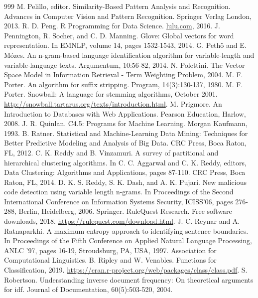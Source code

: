 \documentclass[11pt,openany,executivepaper]{book}
\begin{document}
\begin{thebibliography}{999}
 M. Pelillo, editor. Similarity-Based Pattern Analysis and Recognition. Advances in Computer Vision and Pattern Recognition. Springer Verlag London, 2013.
 R. D. Peng. R Programming for Data Science. \href{http://lulu.com}{lulu.com}, 2016.
 J. Pennington, R. Socher, and C. D. Manning. Glove: Global vectors for word representation. In EMNLP, volume 14, pages 1532-1543, 2014.
 G. Pethö and E. Mózes. An n-gram-based language identification algorithm for variable-length and variable-language texts. Argumentum, 10:56-82, 2014.
 N. Polettini. The Vector Space Model in Information Retrieval - Term Weighting Problem, 2004.
 M. F. Porter. An algorithm for suffix stripping. Program, 14(3):130-137, 1980.
 M. F. Porter. Snowball: A language for stemming algorithms, October 2001. \href{http://snowball.tartarus.org/texts/introduction.html}{http://snowball.tartarus.org/texts/introduction.html}.
 M. Prigmore. An Introduction to Databases with Web Applications. Pearson Education, Harlow, 2008.
 J. R. Quinlan. C4.5: Programs for Machine Learning. Morgan Kaufmann, 1993.
 B. Ratner. Statistical and Machine-Learning Data Mining: Techniques for Better Predictive Modeling and Analysis of Big Data. CRC Press, Boca Raton, FL, 2012.
 C. K. Reddy and B. Vinzamuri. A survey of partitional and hierarchical clustering algorithms. In C. C. Aggarwal and C. K. Reddy, editors, Data Clustering: Algorithms and Applications, pages 87-110. CRC Press, Boca Raton, FL, 2014.
 D. K. S. Reddy, S. K. Dash, and A. K. Pujari. New malicious code detection using variable length n-grams. In Proceedings of the Second International Conference on Information Systems Security, ICISS'06, pages 276-288, Berlin, Heidelberg, 2006. Springer.
 RuleQuest Research. Free software downloads, 2018. \url{https://rulequest.com/download.html}.
 J. C. Reynar and A. Ratnaparkhi. A maximum entropy approach to identifying sentence boundaries. In Proceedings of the Fifth Conference on Applied Natural Language Processing, ANLC '97, pages 16-19, Stroudsburg, PA, USA, 1997. Association for Computational Linguistics.
 B. Ripley and W. Venables. Functions for Classification, 2019. \href{https://cran.r-project.org/web/packages/class/class.pdf}{https://cran.r-project.org/web/packages/class/class.pdf}.
 S. Robertson. Understanding inverse document frequency: On theoretical arguments for idf. Journal of Documentation, 60(5):503-520, 2004.

\end{thebibliography}
\end{document}
